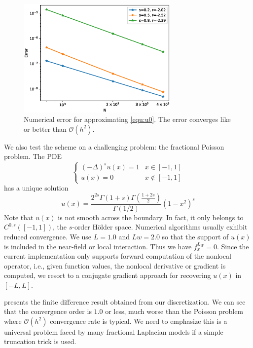 \documentclass[10pt,a4paper]{article}
\theoremstyle{definition}
\begin{document}
\begin{figure}[H] %
\centering
\includegraphics[width=0.7\textwidth,keepaspectratio]{figures/fig5}
\caption{Numerical error for approximating \cref{equ:u0}. The error converges like or better than $\mathcal{O}(h^2)$.}
\label{fig:fig5}
\end{figure}

We also test the scheme on a challenging problem: the fractional Poisson problem. The PDE
\begin{equation}
	\begin{cases}
		(-\Delta)^s u(x) = 1 & x\in [-1,1]\\
		u(x) = 0 & x\not\in [-1,1]
	\end{cases}
\end{equation}
has a unique solution
\begin{equation}
	u(x) = \frac{2^{2s}\Gamma(1+s)\Gamma\left( \frac{1+2s}{2} \right) }{\Gamma(1/2)} (1-x^2)^s
\end{equation}
Note that $u(x)$ is not smooth across the boundary. In fact, it only belongs to $C^{0,s}([-1,1])$, the $s$-order H\"older space. Numerical algorithms usually exhibit reduced convergence.  We use $L=1.0$ and $Lw=2.0$ so that the support of $u(x)$ is included in the near-field or local interaction. Thus we have $f_x^{L_W}=0$. Since the current implementation only supports forward computation of the nonlocal operator, i.e., given function values, the nonlocal derivative or gradient is computed, we resort to a conjugate gradient approach for recovering $u(x)$ in $[-L,L]$. 

 presents the finite difference result obtained from our discretization. We can see that the convergence order is $1.0$ or less, much worse than the Poisson problem where $\mathcal{O}(h^2)$ convergence rate is typical. We need to emphasize this is a universal problem faced by many fractional Laplacian models if a simple truncation trick is used. 
\end{document}
